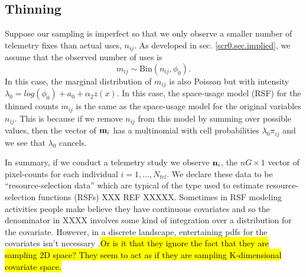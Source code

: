 \subsection{Thinning}

Suppose our sampling is imperfect so that we only observe a smaller
number of telemetry fixes than actual uses, $n_{ij}$. As developed in
sec. \ref{scr0.sec.implied}, we assume that the observed number of
uses is
\[
 m_{ij} \sim \mbox{Bin}(n_{ij}, \phi_{0}).
\]
In this case, the marginal distribution of $m_{ij}$ is also Poisson
but with intensity $\lambda_{0} = log(\phi_{0}) + a_{0} +
\alpha_{2}z(x)$.  In this case, the space-usage model (RSF) for the
thinned counts $m_{ij}$ is the same as the space-usage model for the
original variables $n_{ij}$.  This is because if we remove $n_{ij}$
from this model by summing over possible values, then the vector of
${\bf m}_{i}$ has a multinomial with cell probabilities
$\lambda_{0}\pi_{ij}$ and we see that $\lambda_{0}$ cancels.


In summary, if we conduct a telemetry study we observe ${\bf n}_{i}$,
the $nG \times 1$ vector of pixel-counts for each individual
$i=1,\ldots,N_{tel}$.  We declare these data to be
``resource-selection data'' which are typical of the type used to
estimate resource-selection functions (RSFs) XXX REF XXXXX. Sometimes
in RSF modeling activities people make believe they have continuous
covariates and so the denominator in XXXX involves some kind of
integration over a distribution for the covariate. However, in a
discrete landscape, entertaining pdfs for the covariates isn't
necessary \citep{royle_etal:2012mee}.\hl{Or is it that they ignore the
  fact that they are sampling 2D space? They seem to act as if they
  are sampling K-dimensional covariate space.}


